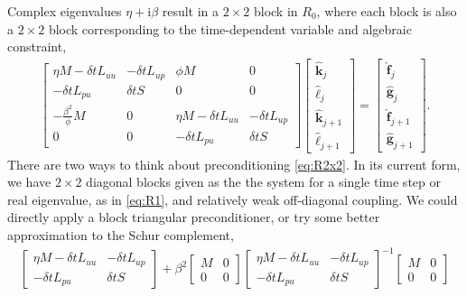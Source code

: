 \documentclass[a4paper,10pt]{article}
\begin{document}
Complex eigenvalues $\eta + \mathrm{i}\beta$ result in a $2\times 2$ block
in $R_0$, where each block is also a $2\times 2$ block corresponding to the
time-dependent variable and algebraic constraint,
%
\begin{align}\label{eq:R2x2}
\begin{bmatrix}
	\eta M - \delta tL_{uu} & -\delta tL_{up} & \phi M & 0 \\
		-\delta tL_{pu} & \delta tS & 0 & 0 \\
	-\frac{\beta^2}{\phi}M & 0 & \eta M - \delta tL_{uu} & -\delta tL_{up} \\
	0 & 0 & -\delta tL_{pu} & \delta tS
	\end{bmatrix}
	\begin{bmatrix} \hat{\mathbf{k}}_j \\ \hat{\ell}_j \\
		\hat{\mathbf{k}}_{j+1} \\ \hat{\ell}_{j+1} \end{bmatrix} =
	\begin{bmatrix} \hat{\mathbf{f}}_j \\ \hat{\mathbf{g}}_j \\
		\hat{\mathbf{f}}_{j+1} \\ \hat{\mathbf{g}}_{j+1} \end{bmatrix}.
\end{align}
%
There are two ways to think about preconditioning \eqref{eq:R2x2}. In 
its current form, we have $2\times 2$ diagonal blocks given as the the
system for a single time step or real eigenvalue, as in \eqref{eq:R1},
and relatively weak off-diagonal coupling. We could directly apply a
block triangular preconditioner, or try some better approximation to
the Schur complement,
%
\begin{align*}
\begin{bmatrix} \eta M - \delta tL_{uu} & -\delta tL_{up} \\ -\delta tL_{pu} & \delta tS
		\end{bmatrix} +
	\beta^2 \begin{bmatrix} M & 0 \\ 0 & 0 \end{bmatrix}
	\begin{bmatrix} \eta M - \delta tL_{uu} & -\delta tL_{up} \\ -\delta tL_{pu} & \delta tS
	\end{bmatrix}^{-1}
	\begin{bmatrix} M & 0 \\ 0 & 0 \end{bmatrix}
\end{align*}
\end{document}
